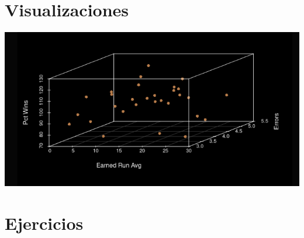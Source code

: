 \documentclass[10pt,a4paper]{article} %
\begin{document}
    \section{Visualizaciones}
        \includegraphics[width=0.5\linewidth]{visu.png}
    \section{Ejercicios}






















    \nocite{*}
    
    
\end{document}
